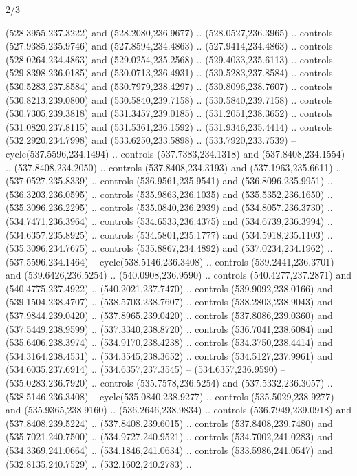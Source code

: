 \begin{flagdescription}{2/3}
\begin{scope}[xshift=0.5\flaglength,yshift=0.5\flagwidth,scale=\flagwidth/495.65]
\begin{scope}[y=0.8pt, x=0.8pt, yscale=-1,shift={(-463.76,-309.78)}]
  (528.3955,237.3222) and (528.2080,236.9677) .. (528.0527,236.3965) .. controls
  (527.9385,235.9746) and (527.8594,234.4863) .. (527.9414,234.4863) .. controls
  (528.0264,234.4863) and (529.0254,235.2568) .. (529.4033,235.6113) .. controls
  (529.8398,236.0185) and (530.0713,236.4931) .. (530.5283,237.8584) .. controls
  (530.5283,237.8584) and (530.7979,238.4297) .. (530.8096,238.7607) .. controls
  (530.8213,239.0800) and (530.5840,239.7158) .. (530.5840,239.7158) .. controls
  (530.7305,239.3818) and (531.3457,239.0185) .. (531.2051,238.3652) .. controls
  (531.0820,237.8115) and (531.5361,236.1592) .. (531.9346,235.4414) .. controls
  (532.2920,234.7998) and (533.6250,233.5898) .. (533.7920,233.7539) --
  cycle(537.5596,234.1494) .. controls (537.7383,234.1318) and
  (537.8408,234.1554) .. (537.8408,234.2050) .. controls (537.8408,234.3193) and
  (537.1963,235.6611) .. (537.0527,235.8339) .. controls (536.9561,235.9541) and
  (536.8096,235.9951) .. (536.3203,236.0595) .. controls (535.9863,236.1035) and
  (535.5352,236.1650) .. (535.3096,236.2295) .. controls (535.0840,236.2939) and
  (534.8057,236.3730) .. (534.7471,236.3964) .. controls (534.6533,236.4375) and
  (534.6739,236.3994) .. (534.6357,235.8925) .. controls (534.5801,235.1777) and
  (534.5918,235.1103) .. (535.3096,234.7675) .. controls (535.8867,234.4892) and
  (537.0234,234.1962) .. (537.5596,234.1464) -- cycle(538.5146,236.3408) ..
  controls (539.2441,236.3701) and (539.6426,236.5254) .. (540.0908,236.9590) ..
  controls (540.4277,237.2871) and (540.4775,237.4922) .. (540.2021,237.7470) ..
  controls (539.9092,238.0166) and (539.1504,238.4707) .. (538.5703,238.7607) ..
  controls (538.2803,238.9043) and (537.9844,239.0420) .. (537.8965,239.0420) ..
  controls (537.8086,239.0360) and (537.5449,238.9599) .. (537.3340,238.8720) ..
  controls (536.7041,238.6084) and (535.6406,238.3974) .. (534.9170,238.4238) ..
  controls (534.3750,238.4414) and (534.3164,238.4531) .. (534.3545,238.3652) ..
  controls (534.5127,237.9961) and (534.6035,237.6914) .. (534.6357,237.3545) --
  (534.6357,236.9590) -- (535.0283,236.7920) .. controls (535.7578,236.5254) and
  (537.5332,236.3057) .. (538.5146,236.3408) -- cycle(535.0840,238.9277) ..
  controls (535.5029,238.9277) and (535.9365,238.9160) .. (536.2646,238.9834) ..
  controls (536.7949,239.0918) and (537.8408,239.5224) .. (537.8408,239.6015) ..
  controls (537.8408,239.7480) and (535.7021,240.7500) .. (534.9727,240.9521) ..
  controls (534.7002,241.0283) and (534.3369,241.0664) .. (534.1846,241.0634) ..
  controls (533.5986,241.0547) and (532.8135,240.7529) .. (532.1602,240.2783) ..

\end{scope}
\end{scope}
\end{flagdescription}
